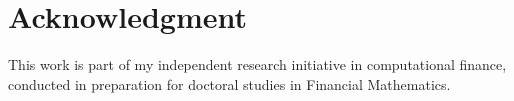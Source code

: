 \documentclass[12pt]{article}
\begin{document}
\section*{Acknowledgment}
This work is part of my independent research initiative in computational finance, conducted in preparation for doctoral studies in Financial Mathematics.




\end{document}

